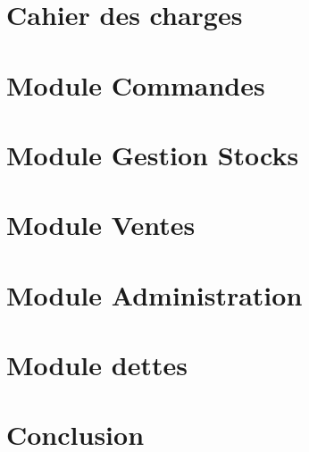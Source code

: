 \documentclass[twoside,UTF8]{EPURapport}
\begin{document}
\chapter{Cahier des charges}

\chapter{Module Commandes}

\chapter{Module Gestion Stocks}

\chapter{Module Ventes}

\chapter{Module Administration}

\chapter{Module dettes}

\chapter{Conclusion}

\annexes
\end{document}
